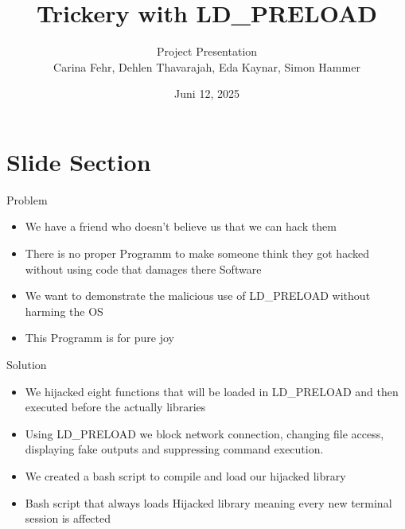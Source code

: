 \documentclass[aspectratio=169,xcolor=table]{beamer}
\title              {Trickery with LD\_PRELOAD}
\author             {Project Presentation\\ Carina Fehr, Dehlen Thavarajah, Eda Kaynar, Simon Hammer}
\institute          {Operating Systems Lecture Spring Semester 2025}
\date               {Juni 12, 2025}
\begin{document}
\renewcommand{\arraystretch}{1.5}

\begin{frame}[t,plain]
\titlepage
\end{frame}





\section{Slide Section}

\begin{frame}[c]{Problem}
\begin{itemize}
    \item We have a friend who doesn't believe us that we can hack them 
    \item There is no proper Programm to make someone think they got hacked without using 
        code that damages there Software
    \item We want to demonstrate the malicious use of LD\_PRELOAD without harming the OS
    \item This Programm is for pure joy
\end{itemize}

\end{frame}


\begin{frame}[c]{Solution}
\begin{itemize}
    \item We hijacked eight functions that will be loaded in LD\_PRELOAD and then executed 
        before the actually libraries 
    \item Using LD\_PRELOAD we block network connection, changing file access, displaying 
        fake outputs and suppressing command execution. 
    \item We created a bash script to compile and load our hijacked library
    \item Bash script that always loads Hijacked library meaning every new terminal session 
        is affected
\end{itemize}

\end{frame}
\end{document}
